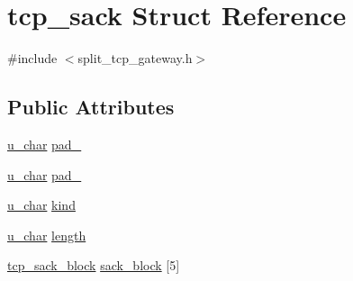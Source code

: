 \hypertarget{structtcp__sack}{\section{tcp\-\_\-sack \-Struct \-Reference}
\label{structtcp__sack}
}


{\ttfamily \#include $<$split\-\_\-tcp\-\_\-gateway.\-h$>$}

\subsection*{\-Public \-Attributes}
\begin{DoxyCompactItemize}
\item 
\hyperlink{split__tcp__gateway_8h_ae2b02ed168fc99cff3851603910b1fb6}{u\-\_\-char} \hyperlink{structtcp__sack_a5c3aee8a5a49aedbf2748f6f59dd91e7}{pad\-\_}
\item 
\hyperlink{split__tcp__gateway_8h_ae2b02ed168fc99cff3851603910b1fb6}{u\-\_\-char} \hyperlink{structtcp__sack_ada362f6194b8cdf78587682882a89843}{pad\-\_}
\item 
\hyperlink{split__tcp__gateway_8h_ae2b02ed168fc99cff3851603910b1fb6}{u\-\_\-char} \hyperlink{structtcp__sack_acdca33b1e8c3971e1290782cc5595c0f}{kind}
\item 
\hyperlink{split__tcp__gateway_8h_ae2b02ed168fc99cff3851603910b1fb6}{u\-\_\-char} \hyperlink{structtcp__sack_a85395de82d87dd9a987320d5d27c48fb}{length}
\item 
\hyperlink{structtcp__sack__block}{tcp\-\_\-sack\-\_\-block} \hyperlink{structtcp__sack_ad10a084fa496be3cad68023841f6ebe4}{sack\-\_\-block} \mbox{[}5\mbox{]}
\end{DoxyCompactItemize}


